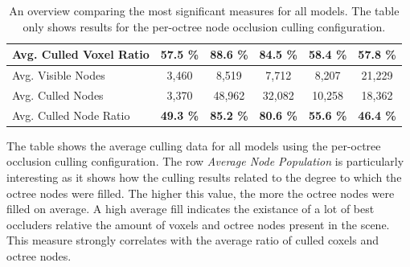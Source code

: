 \begin{table}[!htb]
\begin{tabular}{|lccccc|}
    \multicolumn{1}{|l|}{Avg. Culled Voxel Ratio}   & \multicolumn{1}{c|}{\textbf{57.5 \%}}         & \multicolumn{1}{c|}{\textbf{88.6 \%}}         & \multicolumn{1}{c|}{\textbf{84.5 \%}} & \multicolumn{1}{c|}{\textbf{58.4 \%}}     & \multicolumn{1}{c|}{\textbf{57.8 \%}}     \\ \hline
    \multicolumn{1}{|l|}{Avg. Visible Nodes}        & \multicolumn{1}{c|}{3,460}                    & \multicolumn{1}{c|}{8,519}                    & \multicolumn{1}{c|}{7,712}            & \multicolumn{1}{c|}{8,207}                & \multicolumn{1}{c|}{21,229}               \\
    \multicolumn{1}{|l|}{Avg. Culled Nodes}         & \multicolumn{1}{c|}{3,370}                    & \multicolumn{1}{c|}{48,962}                   & \multicolumn{1}{c|}{32,082}           & \multicolumn{1}{c|}{10,258}               & \multicolumn{1}{c|}{18,362}               \\
    \multicolumn{1}{|l|}{Avg. Culled Node Ratio}    & \multicolumn{1}{c|}{\textbf{49.3 \%}}         & \multicolumn{1}{c|}{\textbf{85.2 \%}}         & \multicolumn{1}{c|}{\textbf{80.6 \%}} & \multicolumn{1}{c|}{\textbf{55.6 \%}}     & \multicolumn{1}{c|}{\textbf{46.4 \%}}     \\ \hline
    
  \end{tabular}
  \caption{An overview comparing the most significant measures for all models. 
  The table only shows results for the per-octree node occlusion culling configuration.}
  \label{tbl:culling-result-overview-pooc}
\end{table}
  
\noindent
The table shows the average culling data for all models using the per-octree occlusion culling configuration.
The row \emph{Average Node Population} is particularly interesting as it shows how the culling results related 
to the degree to which the octree nodes were filled. The higher this value, the more the octree nodes were filled 
on average. A high average fill indicates the existance of a lot of best occluders relative the amount of voxels 
and octree nodes present in the scene. This measure strongly correlates with the average ratio of culled coxels and 
octree nodes. \\


